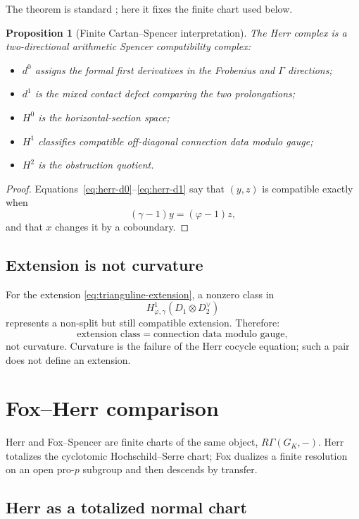 \documentclass[11pt]{article}
\newtheorem{proposition}[theorem]{Proposition}
\theoremstyle{definition}
\begin{document}
The theorem is standard \cite{HerrSurvey,LiuCohomology}; here it fixes the finite chart used below.

\begin{proposition}[Finite Cartan--Spencer interpretation]\label{prop:herr-spencer}
The Herr complex is a two-directional arithmetic Spencer compatibility complex:
\begin{itemize}
\item $d^0$ assigns the formal first derivatives in the Frobenius and $\Gamma$ directions;
\item $d^1$ is the mixed contact defect comparing the two prolongations;
\item $H^0$ is the horizontal-section space;
\item $H^1$ classifies compatible off-diagonal connection data modulo gauge;
\item $H^2$ is the obstruction quotient.
\end{itemize}
\end{proposition}

\begin{proof}
Equations~\eqref{eq:herr-d0}--\eqref{eq:herr-d1} say that $(y,z)$ is compatible exactly when
\[
(\gamma-1)y=(\varphi-1)z,
\]
and that $x$ changes it by a coboundary.
\end{proof}

\subsection{Extension is not curvature}

For the extension \eqref{eq:trianguline-extension}, a nonzero class in
\[
H^1_{\varphi,\gamma}(D_1\otimes D_2^\vee)
\]
represents a non-split but still compatible extension.  Therefore:
\[
\boxed{\text{extension class} = \text{connection data modulo gauge},}
\]
not curvature.  Curvature is the failure of the Herr cocycle equation; such a pair does not define an extension.

\section{Fox--Herr comparison}\label{sec:fox-herr-bridge}

Herr and Fox--Spencer are finite charts of the same object, $R\Gamma(G_K,-)$.  Herr totalizes the cyclotomic Hochschild--Serre chart; Fox dualizes a finite resolution on an open pro-$p$ subgroup and then descends by transfer.

\subsection{Herr as a totalized normal chart}
\end{document}
